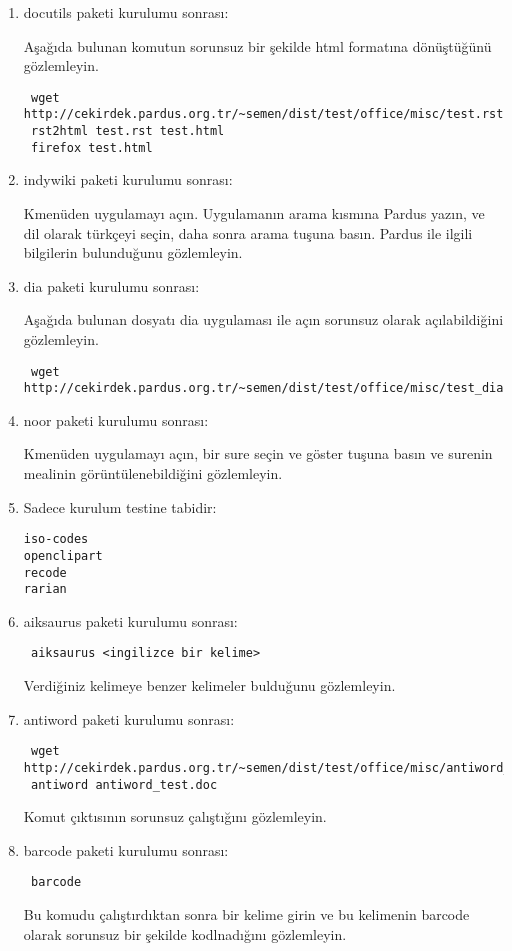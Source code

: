 \documentclass[a4paper,10pt]{article}
\begin{document}
\begin{enumerate}
\item docutils paketi kurulumu sonrası:

Aşağıda bulunan komutun sorunsuz bir şekilde html formatına dönüştüğünü gözlemleyin.
\begin{verbatim}
 wget http://cekirdek.pardus.org.tr/~semen/dist/test/office/misc/test.rst
 rst2html test.rst test.html
 firefox test.html
\end{verbatim}

\item indywiki paketi kurulumu sonrası:

Kmenüden uygulamayı açın. Uygulamanın arama kısmına Pardus yazın, ve dil olarak türkçeyi seçin, daha sonra arama tuşuna basın. Pardus ile ilgili bilgilerin bulunduğunu gözlemleyin.
\item dia paketi kurulumu sonrası:

Aşağıda bulunan dosyatı dia uygulaması ile açın sorunsuz olarak açılabildiğini gözlemleyin.
\begin{verbatim}
 wget http://cekirdek.pardus.org.tr/~semen/dist/test/office/misc/test_dia.dia
\end{verbatim}


\item noor paketi kurulumu sonrası:

Kmenüden uygulamayı açın, bir sure seçin ve göster tuşuna basın ve surenin mealinin görüntülenebildiğini gözlemleyin.
\item Sadece kurulum testine tabidir:
\begin{verbatim}
iso-codes
openclipart
recode
rarian
\end{verbatim}
\item aiksaurus paketi kurulumu sonrası:
\begin{verbatim}
 aiksaurus <ingilizce bir kelime>
\end{verbatim}

Verdiğiniz kelimeye benzer kelimeler bulduğunu gözlemleyin.

\item antiword paketi kurulumu sonrası:
\begin{verbatim}
 wget http://cekirdek.pardus.org.tr/~semen/dist/test/office/misc/antiword_test.doc
 antiword antiword_test.doc
\end{verbatim}

Komut çıktısının sorunsuz çalıştığını gözlemleyin.

\item barcode paketi kurulumu sonrası:
\begin{verbatim}
 barcode
\end{verbatim}
 Bu komudu çalıştırdıktan sonra bir kelime girin ve bu kelimenin barcode olarak sorunsuz bir şekilde kodlnadığını gözlemleyin.


\end{enumerate}
\end{document}
